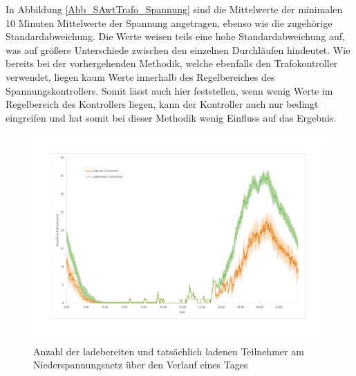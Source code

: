 In Abbildung \ref{Abb_SAwtTrafo_Spannung} sind die Mittelwerte der minimalen 10 Minuten Mittelwerte der Spannung angetragen, ebenso wie die zugehörige Standardabweichung. Die Werte weisen teils eine hohe Standardabweichung auf, was auf größere Unterschiede zwischen den einzelnen Durchläufen hindeutet. Wie bereits bei der vorhergehenden Methodik, welche ebenfalls den Trafokontroller verwendet, liegen kaum Werte innerhalb des Regelbereiches des Spannungskontrollers. Somit lässt auch hier feststellen, wenn wenig Werte im Regelbereich des Kontrollers liegen, kann der Kontroller auch nur bedingt eingreifen und hat somit bei dieser Methodik wenig Einfluss auf das Ergebnis.\\
\begin{figure}[htb]
\centering
	\includegraphics[scale=0.5]{img/SA_wT_trafo/Teilnehmer.pdf}
	\caption{Anzahl der ladebereiten und tatsächlich ladenen Teilnehmer am Niederspannungsnetz über den Verlauf eines Tages}
	\label{Abb_SAwtTrafo_Teilnehmer}
\end{figure}

